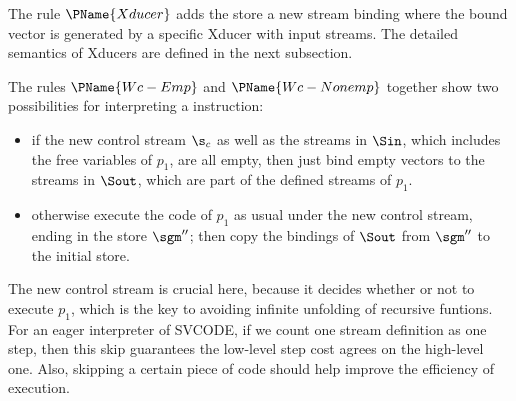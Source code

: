 The rule $\PName{Xducer}$ adds the store a new stream binding where the bound vector is generated by a specific Xducer with input streams. The detailed semantics of Xducers are defined in the next subsection. 

The rules $\PName{Wc-Emp}$ and $\PName{Wc-Nonemp}$ together show two possibilities for interpreting a \wc instruction:
\begin{itemize}
	\item if the new control stream $\s_c$ as well as the streams in $\Sin$, which includes the free variables of $p_1$, are all empty, then just bind empty vectors to the streams in $\Sout$, which are part of the defined streams of $p_1$.
	\item otherwise execute the code of $p_1$ as usual under the new control stream, ending in the store $\sgm''$; then copy the bindings of $\Sout$ from $\sgm''$ to the initial store. 
\end{itemize}
The new control stream is crucial here, because it decides whether or not to execute $p_1$, which is the key to avoiding infinite unfolding of recursive funtions. For an eager interpreter of SVCODE, if we count one stream definition as one step, then this skip guarantees the low-level step cost agrees on the high-level one. Also, skipping a certain piece of code should help improve the efficiency of execution.


